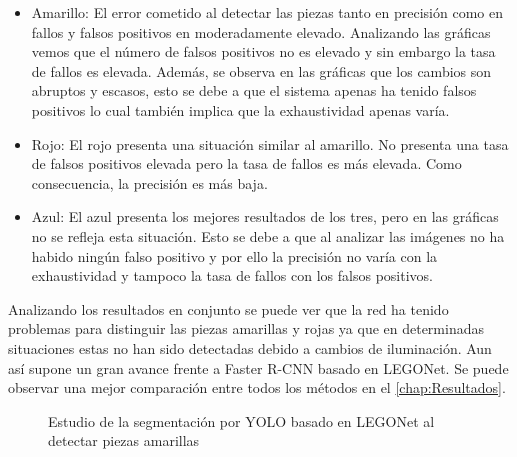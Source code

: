 \begin{itemize}
\item Amarillo: El error cometido al detectar las piezas tanto en precisión como en fallos y falsos positivos en moderadamente elevado. Analizando las gráficas vemos que el número de falsos positivos no es elevado y sin embargo la tasa de fallos es elevada. Además, se observa en las gráficas que los cambios son abruptos y escasos, esto se debe a que el sistema apenas ha tenido falsos positivos lo cual también implica que la exhaustividad apenas varía.
\item Rojo: El rojo presenta una situación similar al amarillo. No presenta una tasa de falsos positivos elevada pero la tasa de fallos es más elevada. Como consecuencia, la precisión es más baja.
\item Azul: El azul presenta los mejores resultados de los tres, pero en las gráficas no se refleja esta situación. Esto se debe a que al analizar las imágenes no ha habido ningún falso positivo y por ello la precisión no varía con la exhaustividad y tampoco la tasa de fallos con los falsos positivos.
\end{itemize}

Analizando los resultados en conjunto se puede ver que la red ha tenido problemas para distinguir las piezas amarillas y rojas ya que en determinadas situaciones estas no han sido detectadas debido a cambios de iluminación. Aun así supone un gran avance frente a Faster R-CNN basado en LEGONet. Se puede observar una mejor comparación entre todos los métodos en el \autoref{chap:Resultados}.

\begin{figure}[ht]  %
  \hfill	
\caption{Estudio de la segmentación por YOLO basado en LEGONet al detectar piezas amarillas}
\label{fig:yellow YOLO LEGONet}
\vspace{-5pt}
\end{figure}

